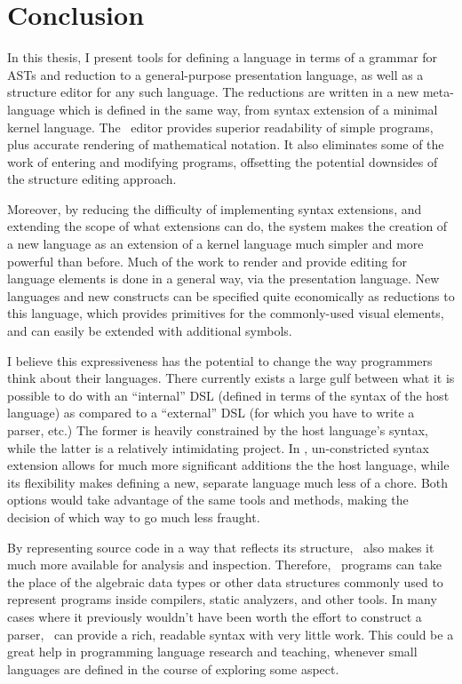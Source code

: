 \chapter{Conclusion}

In this thesis, I present tools for defining a language in terms of a grammar for ASTs and reduction to a general-purpose presentation language, as well as a structure editor for any such language. The reductions are written in a new meta-language which is defined in the same way, from syntax extension of a minimal kernel language. The \Meta\ editor provides superior readability of simple programs, plus accurate rendering of mathematical notation. It also eliminates some of the work of entering and modifying programs, offsetting the potential downsides of the structure editing approach.

Moreover, by reducing the difficulty of implementing syntax extensions, and extending the scope of what extensions can do, the system makes the creation of a new language as an extension of a kernel language much simpler and more powerful than before. Much of the work to render and provide editing for language elements is done in a general way, via the presentation language. New languages and new constructs can be specified quite economically as reductions to this language, which provides primitives for the commonly-used visual elements, and can easily be extended with additional symbols.

I believe this expressiveness has the potential to change the way programmers think about their languages. There currently exists a large gulf between what it is possible to do with an ``internal'' DSL (defined in terms of the syntax of the host language) as compared to a ``external'' DSL (for which you have to write a parser, etc.) The former is heavily constrained by the host language's syntax, while the latter is a relatively intimidating project. In \Meta, un-constricted syntax extension allows for much more significant additions the the host language, while its flexibility makes defining a new, separate language much less of a chore. Both options would take advantage of the same tools and methods, making the decision of which way to go much less fraught.

By representing source code in a way that reflects its structure, \Meta\ also makes it much more available for analysis and inspection. Therefore, \Meta\ programs can take the place of the algebraic data types or other data structures commonly used to represent programs inside compilers, static analyzers, and other tools. In many cases where it previously wouldn't have been worth the effort to construct a parser, \Meta\ can provide a rich, readable syntax with very little work. This could be a great help in programming language research and teaching, whenever small languages are defined in the course of exploring some aspect.

